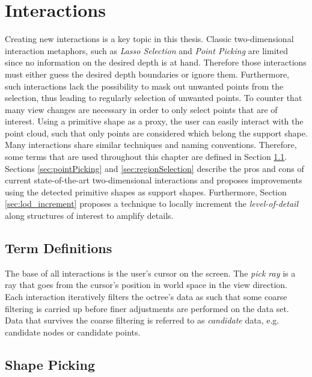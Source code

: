 \chapter{Interactions}

Creating new interactions is a key topic in this thesis. Classic two-dimensional interaction metaphors, such as \textit{Lasso Selection} and \textit{Point Picking} are limited since no information on the desired depth is at hand. Therefore those interactions must either guess the desired depth boundaries or ignore them. Furthermore, such interactions lack the possibility to mask out unwanted points from the selection, thus leading to regularly selection of unwanted points. To counter that many view changes are necessary in order to only select points that are of interest. Using a primitive shape as a proxy, the user can easily interact with the point cloud, such that only points are considered which belong the support shape. 
\\
Many interactions share similar techniques and naming conventions. Therefore, some terms that are used throughout this chapter are defined in Section \ref{sec:termDefinitions}. Sections \ref{sec:pointPicking} and \ref{sec:regionSelection} describe the pros and cons of current state-of-the-art two-dimensional interactions and proposes improvements using the detected primitive shapes as support shapes. Furthermore, Section \ref{sec:lod_increment} proposes a technique to locally increment the \textit{level-of-detail} along structures of interest to amplify details. 


\section{Term Definitions}
\label{sec:termDefinitions}

The base of all interactions is the user's cursor on the screen. The \textit{pick ray} is a ray that goes from the cursor’s position in world space in the view direction. 
Each interaction iteratively filters the octree's data as such that some coarse filtering is carried up before finer adjustments are performed on the data set. Data that survives the coarse filtering is referred to as \textit{candidate} data, e.g. candidate nodes or candidate points. 


\section{Shape Picking}
\label{sec:shapePicking}

